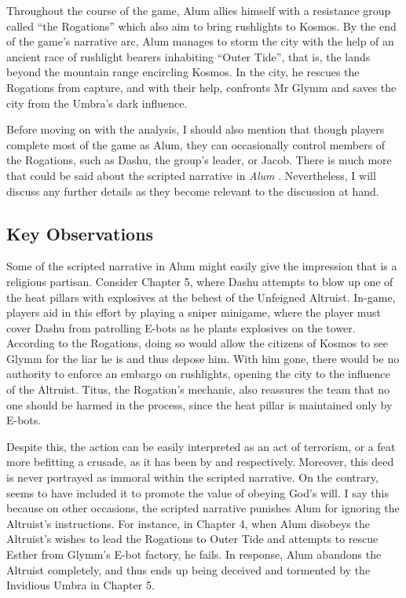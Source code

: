 Throughout the course of the game, Alum allies himself with a resistance group called ``the Rogations'' which also aim to bring rushlights to Kosmos. By the end of the game's narrative arc, Alum manages to storm the city with the help of an ancient race of rushlight bearers inhabiting ``Outer Tide'', that is, the lands beyond the mountain range encircling Kosmos. In the city, he rescues the Rogations from capture, and with their help, confronts Mr Glymm and saves the city from the Umbra's dark influence.

Before moving on with the analysis, I should also mention that though players complete most of the game as Alum, they can occasionally control members of the Rogations, such as Dashu, the group's leader, or Jacob. There is much more that could be said about the scripted narrative in \textit{Alum} \parencite{orsie_alum_2006}. Nevertheless, I will discuss any further details as they become relevant to the discussion at hand.



 
\subsection{Key Observations} \label{sec:alum_key_observations}

Some of the scripted narrative in Alum might easily give the impression that \parencite{orsie_alum_2006} is a religious partisan. Consider Chapter 5, where Dashu attempts to blow up one of the heat pillars with explosives at the behest of the Unfeigned Altruist. In-game, players aid in this effort by playing a sniper minigame, where the player must cover Dashu from patrolling E-bots as he plants explosives on the tower. According to the Rogations, doing so would allow the citizens of Kosmos to see Glymm for the liar he is and thus depose him. With him gone, there would be no authority to enforce an embargo on rushlights, opening the city to the influence of the Altruist. Titus, the Rogation’s mechanic, also reassures the team that no one should be harmed in the process, since the heat pillar is maintained only by E-bots.

Despite this, the action can be easily interpreted as an act of terrorism, or a feat more befitting a crusade, as it has been by \textcite[para. 2]{adam_review_2015} and \textcite[9:43]{innuendo_studios_co-vids_2020} respectively. Moreover, this deed is never portrayed as immoral within the scripted narrative. On the contrary, \textcite{orsie_alum_2006} seems to have included it to promote the value of obeying God’s will. I say this because on other occasions, the scripted narrative punishes Alum for ignoring the Altruist’s instructions. For instance, in Chapter 4, when Alum disobeys the Altruist’s wishes to lead the Rogations to Outer Tide and attempts to rescue Esther from Glymm’s E-bot factory, he fails. In response, Alum abandons the Altruist completely, and thus ends up being deceived and tormented by the Invidious Umbra in Chapter 5.

